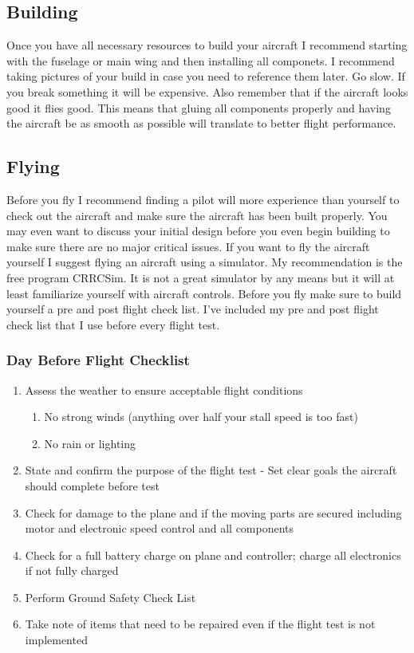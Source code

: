 \subsection{Building}

Once you have all necessary resources to build your aircraft I
recommend starting with the fuselage or main wing and then installing
all componets. I recommend taking pictures of your build in case you
need to reference them later. Go slow. If you break something it will
be expensive. Also remember that if the aircraft looks good it flies
good. This means that gluing all components properly and having the
aircraft be as smooth as possible will translate to better flight
performance. 

\subsection{Flying}

Before you fly I recommend finding a pilot will more experience than
yourself to check out the aircraft and make sure the aircraft has been
built properly. You may even want to discuss your initial design
before you even begin building to make sure there are no major
critical issues. If you want to fly the aircraft yourself I suggest
flying an aircraft using a simulator. My recommendation is the free
program CRRCSim\cite{CRRCSim}. It is not a great simulator by any means but it will
at least familiarize yourself with aircraft controls. Before you fly
make sure to build yourself a pre and post flight check list. I've
included my pre and post flight check list that I use before every
flight test.

\subsubsection{Day Before Flight Checklist}
\begin{enumerate}[itemsep=-5pt]
\item Assess the weather to ensure acceptable flight conditions
  \begin{enumerate}[itemsep=-5pt]
    \item No strong winds (anything over half your stall speed is too fast)
    \item No rain or lighting
  \end{enumerate}
\item State and confirm the purpose of the flight test - Set clear
  goals the aircraft should complete before test 
\item Check for damage to the plane and if the moving parts are secured including motor and electronic speed control and all components
\item Check for a full battery charge on plane and controller; charge
  all electronics if not fully charged
\item Perform Ground Safety Check List
\item Take note of items that need to be repaired even if the flight test is not implemented
\end{enumerate}

